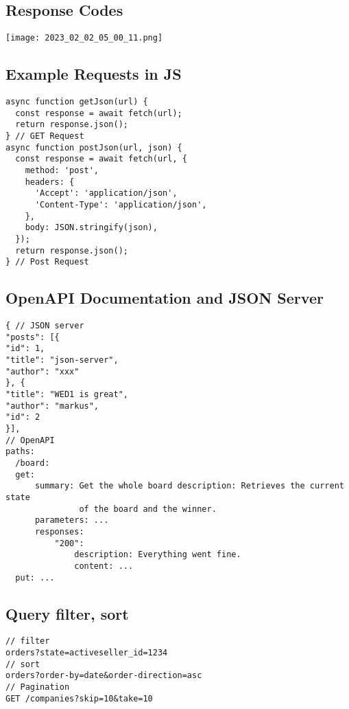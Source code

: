\documentclass[main.tex,fontsize=6pt,paper=a4,paper=landscape,DIV=calc,]{scrartcl}
\begin{document}
\begin{multicols*}{4}
\subsection{Response Codes}
\texttt{[image: 2023\_02\_02\_05\_00\_11.png]}

\subsection{Example Requests in JS}
\vspace{-2mm}
\begin{lstlisting}
async function getJson(url) {
  const response = await fetch(url);
  return response.json();
} // GET Request
async function postJson(url, json) {
  const response = await fetch(url, {
    method: 'post',
    headers: {
      'Accept': 'application/json',
      'Content-Type': 'application/json',
    },
    body: JSON.stringify(json),
  });
  return response.json();
} // Post Request
\end{lstlisting}
\vspace{2mm}

\subsection{OpenAPI Documentation and JSON Server}
\vspace{-2mm}
\begin{lstlisting}
{ // JSON server
"posts": [{
"id": 1,
"title": "json-server",
"author": "xxx"
}, {
"title": "WED1 is great",
"author": "markus",
"id": 2
}],
// OpenAPI
paths:
  /board:
  get:
      summary: Get the whole board description: Retrieves the current state
               of the board and the winner.
      parameters: ...
      responses:
          "200":
              description: Everything went fine.
              content: ...
  put: ...
\end{lstlisting}
\vspace{2mm}

\subsection{Query filter, sort}  
\vspace{-2mm}
\begin{lstlisting}
// filter
orders?state=activeseller_id=1234
// sort
orders?order-by=date&order-direction=asc
// Pagination
GET /companies?skip=10&take=10
\end{lstlisting}
\vspace{2mm}


\end{multicols*}
\end{document}
